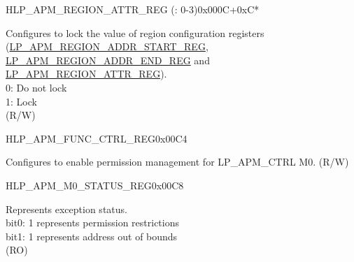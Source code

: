 \begin{register}{H}{LP\_APM\_REGION\_ATTR\_REG (: 0-3)}{0x000C+0xC*}
\begin{regdesc}
\begin{reglist}
\label{fielddesc:LPAPMREGIONNLOCK}\item [LP\_APM\_REGION\regindex{n}\_LOCK] Configures to lock the value of region  configuration registers (\hyperref[regdesc:LPAPMREGIONNADDRSTARTREG]{LP\_APM\_REGION\_ADDR\_START\_REG}, \hyperref[regdesc:LPAPMREGIONNADDRENDREG]{LP\_APM\_REGION\_ADDR\_END\_REG} and \hyperref[regdesc:LPAPMREGIONNATTRREG]{LP\_APM\_REGION\_ATTR\_REG}).\\ 
0: Do not lock \\ 
1: Lock  \\ (R/W)
\end{reglist}\end{regdesc}
\end{register}


\begin{register}{H}{LP\_APM\_FUNC\_CTRL\_REG}{0x00C4}\label{regdesc:LPAPMFUNCCTRLREG}
%
%
\regnewline%
\begin{regdesc}\begin{reglist}
\label{fielddesc:LPAPMM0FUNCEN}\item [LP\_APM\_M0\_FUNC\_EN] Configures to enable permission management for LP\_APM\_CTRL M0. (R/W)
\end{reglist}\end{regdesc}
\end{register}


\begin{register}{H}{LP\_APM\_M0\_STATUS\_REG}{0x00C8}\label{regdesc:LPAPMM0STATUSREG}
%
%
\regnewline%
\begin{regdesc}\begin{reglist}
\label{fielddesc:LPAPMM0EXCEPTIONSTATUS}\item [LP\_APM\_M0\_EXCEPTION\_STATUS] Represents exception status.\\ 
bit0: 1 represents permission restrictions \\ 
bit1: 1 represents address out of bounds  \\ (RO)
\end{reglist}\end{regdesc}
\end{register}


